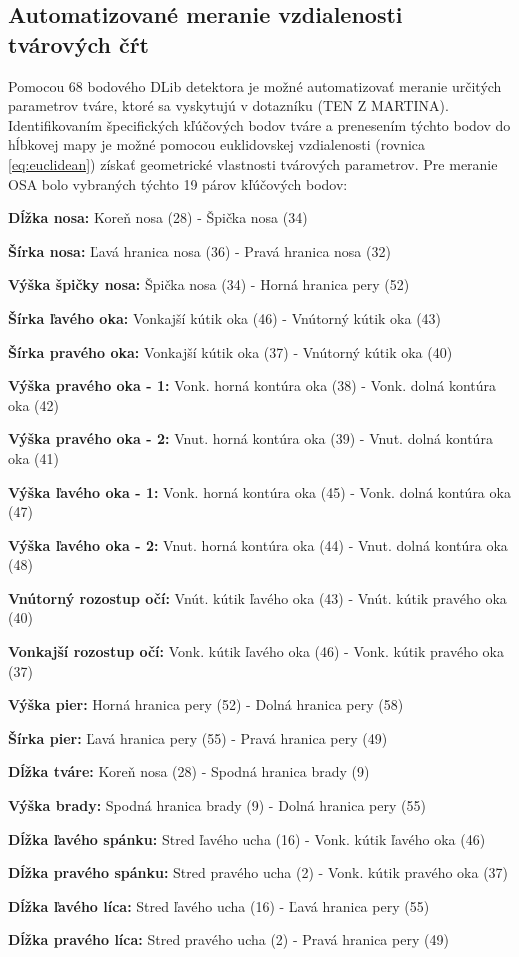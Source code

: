 \subsection{Automatizované meranie vzdialenosti tvárových čŕt}
Pomocou 68 bodového DLib detektora je možné automatizovať meranie určitých parametrov tváre, ktoré sa vyskytujú v dotazníku (TEN Z MARTINA). 
Identifikovaním špecifických kľúčových bodov tváre a prenesením týchto bodov do hĺbkovej mapy je možné pomocou euklidovskej vzdialenosti (rovnica \ref{eq:euclidean}) získať geometrické vlastnosti tvárových parametrov.
Pre meranie OSA bolo vybraných týchto 19 párov kľúčových bodov: 
\vskip 0.2in

\begin{compactitem}
	\item[\textbf{Dĺžka nosa:}] Koreň nosa (28) - Špička nosa (34)
	\item[\textbf{Šírka nosa:}] Ľavá hranica nosa (36) - Pravá hranica nosa (32)
	\item[\textbf{Výška špičky nosa:}] Špička nosa (34) - Horná hranica pery (52)
	\item[\textbf{Šírka ľavého oka:}] Vonkajší kútik oka (46) - Vnútorný kútik oka (43)
	\item[\textbf{Šírka pravého oka:}] Vonkajší kútik oka (37) - Vnútorný kútik oka (40)
	\item[\textbf{Výška pravého oka - 1:}] Vonk. horná kontúra oka (38) - Vonk. dolná kontúra oka (42)
	\item[\textbf{Výška pravého oka - 2:}] Vnut. horná kontúra oka (39) - Vnut. dolná kontúra oka (41)
	\item[\textbf{Výška ľavého oka - 1:}] Vonk. horná kontúra oka (45) - Vonk. dolná kontúra oka (47)
	\item[\textbf{Výška ľavého oka - 2:}] Vnut. horná kontúra oka (44) - Vnut. dolná kontúra oka (48)
	\item[\textbf{Vnútorný rozostup očí:}] Vnút. kútik ľavého oka (43) - Vnút. kútik pravého oka (40)
	\item[\textbf{Vonkajší rozostup očí:}] Vonk. kútik ľavého oka (46) - Vonk. kútik pravého oka (37)
	\item[\textbf{Výška pier:}] Horná hranica pery (52) - Dolná hranica pery (58)
	\item[\textbf{Šírka pier:}] Ľavá hranica pery (55) - Pravá hranica pery (49)
	\item[\textbf{Dĺžka tváre:}] Koreň nosa (28) - Spodná hranica brady (9)
	\item[\textbf{Výška brady:}] Spodná hranica brady (9) - Dolná hranica pery (55)
	\item[\textbf{Dĺžka ľavého spánku:}] Stred ľavého ucha (16) - Vonk. kútik ľavého oka (46)
	\item[\textbf{Dĺžka pravého spánku:}] Stred pravého ucha (2) - Vonk. kútik pravého oka (37)
	\item[\textbf{Dĺžka ľavého líca:}] Stred ľavého ucha (16) - Ľavá hranica pery (55)
	\item[\textbf{Dĺžka pravého líca:}] Stred pravého ucha (2) - Pravá hranica pery (49)
\end{compactitem}

